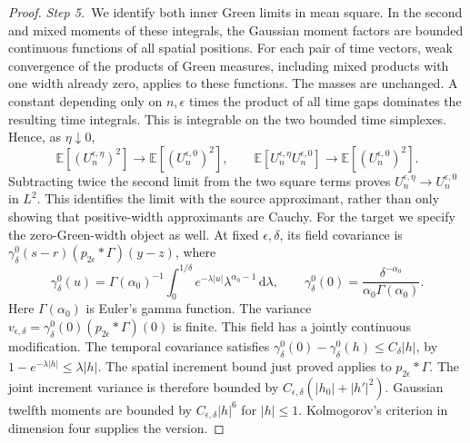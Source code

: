 \documentclass[12pt,oneside,openany]{book}
\numberwithin{equation}{section}
\theoremstyle{nogostyle}
\theoremstyle{definition}
\newcommand{\E}{\mathbb{E}}
\newcommand{\ud}{\,\mathrm{d}}
\begin{document}
\begin{proof}
  \medskip
  \noindent\textit{Step 5.~}We identify both inner Green limits in mean
  square.
  In the second and mixed moments of these integrals, the Gaussian moment
  factors are bounded continuous functions of all spatial positions. For each
  pair of time vectors, weak convergence of the products of Green measures,
  including mixed products with one width already zero, applies to these
  functions. The masses are unchanged. A constant depending only on $n,\epsilon$
  times the product of all time gaps dominates the resulting time integrals.
  This is integrable on the two bounded time simplexes. Hence, as
  $\eta\downarrow0$,
  \[
    \E\left[(U_n^{\epsilon,\eta})^2\right]
    \longrightarrow\E\left[(U_n^{\epsilon,0})^2\right],
    \qquad
    \E\left[U_n^{\epsilon,\eta}U_n^{\epsilon,0}\right]
    \longrightarrow\E\left[(U_n^{\epsilon,0})^2\right].
  \]
  Subtracting twice the second limit from the two square terms proves
  $U_n^{\epsilon,\eta} \to U_n^{\epsilon,0}$ in $L^2$. This identifies the limit
  with the source approximant, rather than only showing that positive-width
  approximants are Cauchy. For the target we specify the zero-Green-width object
  as well. At fixed $\epsilon,\delta$, its field covariance is
  $\gamma_\delta^0(s-r)(p_{2\epsilon}*\Gamma)(y-z)$, where
  \[
    \gamma_\delta^0(u)
    =\Gamma(\alpha_0)^{-1}\int_0^{1/\delta}
    e^{-\lambda|u|}\lambda^{\alpha_0-1}\ud\lambda,\qquad
    \gamma_\delta^0(0)
    =\frac{\delta^{-\alpha_0}}{\alpha_0\Gamma(\alpha_0)}.
  \]
  Here $\Gamma(\alpha_0)$ is Euler's gamma function. The variance
  $v_{\epsilon,\delta} = \gamma_\delta^0(0)(p_{2\epsilon}*\Gamma)(0)$ is finite.
  This field has a jointly continuous modification. The temporal covariance
  satisfies $\gamma_\delta^0(0)-\gamma_\delta^0(h) \le C_\delta|h|$, by
  $1-e^{-\lambda|h|} \le \lambda|h|$. The spatial increment bound just proved
  applies to $p_{2\epsilon}*\Gamma$. The joint increment variance is therefore
  bounded by $C_{\epsilon,\delta}(|h_0|+|h'|^2)$. Gaussian twelfth moments are
  bounded by $C_{\epsilon,\delta}|h|^6$ for $|h| \le 1$. Kolmogorov's criterion
  in dimension four supplies the version.


\end{proof}
\end{document}

